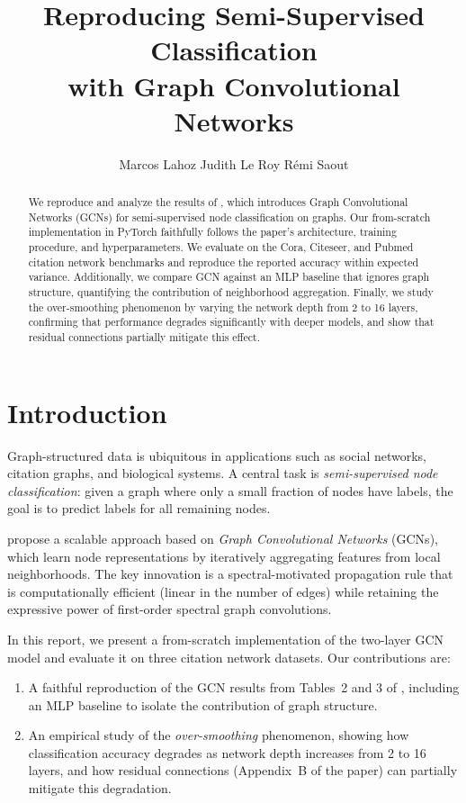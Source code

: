 \documentclass[10pt,twocolumn]{article}
\title{\textbf{Reproducing Semi-Supervised Classification\\with Graph Convolutional Networks}}
\author{
  Marcos Lahoz \quad Judith Le Roy \quad Rémi Saout
}
\date{}
\begin{document}
\maketitle

\begin{abstract}
We reproduce and analyze the results of \citet{kipf2017semi}, which introduces Graph Convolutional Networks (GCNs) for semi-supervised node classification on graphs.
Our from-scratch implementation in PyTorch faithfully follows the paper's architecture, training procedure, and hyperparameters.
We evaluate on the Cora, Citeseer, and Pubmed citation network benchmarks and reproduce the reported accuracy within expected variance.
Additionally, we compare GCN against an MLP baseline that ignores graph structure, quantifying the contribution of neighborhood aggregation.
Finally, we study the over-smoothing phenomenon by varying the network depth from 2 to 16 layers, confirming that performance degrades significantly with deeper models, and show that residual connections partially mitigate this effect.
\end{abstract}

\section{Introduction}
\label{sec:intro}

Graph-structured data is ubiquitous in applications such as social networks, citation graphs, and biological systems.
A central task is \emph{semi-supervised node classification}: given a graph where only a small fraction of nodes have labels, the goal is to predict labels for all remaining nodes.

\citet{kipf2017semi} propose a scalable approach based on \emph{Graph Convolutional Networks} (GCNs), which learn node representations by iteratively aggregating features from local neighborhoods.
The key innovation is a spectral-motivated propagation rule that is computationally efficient (linear in the number of edges) while retaining the expressive power of first-order spectral graph convolutions.

In this report, we present a from-scratch implementation of the two-layer GCN model and evaluate it on three citation network datasets.
Our contributions are:
\begin{enumerate}
    \item A faithful reproduction of the GCN results from Tables~2 and 3 of \citet{kipf2017semi}, including an MLP baseline to isolate the contribution of graph structure.
    \item An empirical study of the \emph{over-smoothing} phenomenon, showing how classification accuracy degrades as network depth increases from 2 to 16 layers, and how residual connections (Appendix~B of the paper) can partially mitigate this degradation.
\end{enumerate}
\end{document}
